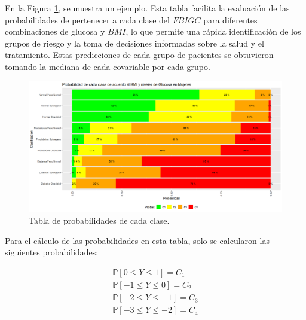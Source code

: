 En la Figura \ref{fig:ejemploTabla}, se muestra un ejemplo. Esta tabla facilita la evaluación de las probabilidades de pertenecer a cada clase del $FBIGC$ para diferentes combinaciones de glucosa y $BMI$, lo que permite una rápida identificación de los grupos de riesgo y la toma de decisiones informadas sobre la salud y el tratamiento. Estas predicciones de cada grupo de pacientes se obtuvieron tomando la mediana de cada covariable por cada grupo.

\begin{figure}[H]
    \centering
    \includegraphics[height = 12 cm, width = 0.98 \textwidth]{4img/tablaM.png}
    \caption{Tabla de probabilidades de cada clase.}
    \label{fig:ejemploTabla}
\end{figure}

Para el cálculo de las probabilidades en esta tabla, solo se calcularon las siguientes probabilidades:

\begin{equation}
     \begin{matrix}
\mathbb{P}[0 \leq Y \leq 1] = C_1 \\
\mathbb{P}[-1 \leq Y \leq 0] = C_2  \\
\mathbb{P}[-2 \leq Y \leq -1] = C_3 \\
\mathbb{P}[-3 \leq Y \leq -2] = C_4 \\
\end{matrix}
\end{equation}

